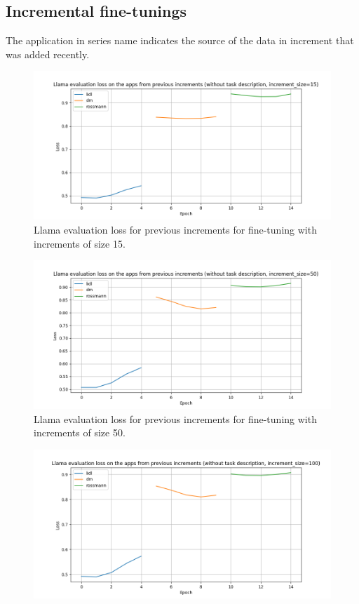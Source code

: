 \documentclass[licencjacka,en]{pracamgr}
\begin{document}
\begin{appendices}
\subsection{Incremental fine-tunings}
The application in series name indicates the source of the data in increment that was added recently.
\begin{figure}[h]
    \centering
    \includegraphics[width=0.8\linewidth]{bachelor_images/llama_ft/llama-inc-15-eval-prev.png}
    \caption{Llama evaluation loss for previous increments for fine-tuning with increments of size 15.}
    \label{fig:llama-inc-15-eval}
\end{figure}
\begin{figure}[h]
    \centering
    \includegraphics[width=0.8\linewidth]{bachelor_images/llama_ft/llama-inc-50-eval-prev.png}
    \caption{Llama evaluation loss for previous increments for fine-tuning with increments of size 50.}
    \label{fig:llama-inc-50-eval}
\end{figure}
\begin{figure}[h]
    \centering
    \includegraphics[width=0.8\linewidth]{bachelor_images/llama_ft/llama-inc-100-eval-prev.png}

\end{figure}
\end{appendices}
\end{document}
